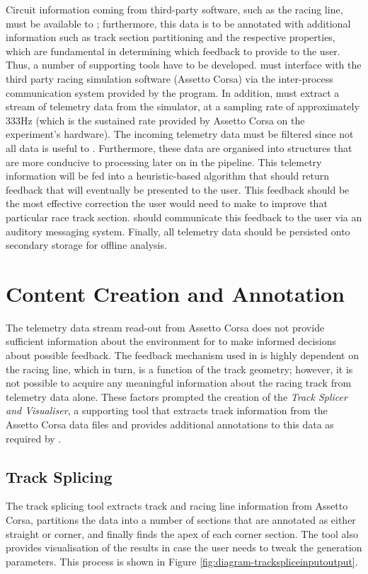 Circuit information coming from third-party software, such as the racing line, must be available to \methodname; furthermore, this data is to be annotated with additional information such as track section partitioning and the respective properties, which are fundamental in determining which feedback to provide to the user. Thus, a number of supporting tools have to be developed.
\methodname must interface with the third party racing simulation software (Assetto Corsa) via the inter-process communication system provided by the program. In addition, \methodname must extract a stream of telemetry data from the simulator, at a sampling rate of approximately 333Hz (which is the sustained rate provided by Assetto Corsa on the experiment's hardware).
The incoming telemetry data must be filtered since not all data is useful to \methodname. Furthermore, these data are organised into structures that are more conducive to processing later on in the pipeline. 
This telemetry information will be fed into a heuristic-based algorithm that should return feedback that will eventually be presented to the user. This feedback should be the most effective correction the user would need to make to improve that particular race track section.
\methodname should communicate this feedback to the user via an auditory messaging system. 
Finally, all telemetry data should be persisted onto secondary storage for offline analysis. 

\section{Content Creation and Annotation}
\label{sec:imp-content-creation}
The telemetry data stream read-out from Assetto Corsa does not provide sufficient information about the environment for \methodname to make informed decisions about possible feedback. The feedback mechanism used in \methodname is highly dependent on the racing line, which in turn, is a function of the track geometry; however, it is not possible to acquire any meaningful information about the racing track from telemetry data alone. These factors prompted the creation of the \emph{Track Splicer and Visualiser}, a supporting tool that extracts track information from the Assetto Corsa data files and provides additional annotations to this data as required by \methodname. 

\subsection{Track Splicing}
\label{sec:imp-trackSplicer}
The track splicing tool extracts track and racing line information from Assetto Corsa, partitions the data into a number of sections that are annotated as either straight or corner, and finally finds the apex of each corner section. The tool also provides visualisation of the results in case the user needs to tweak the generation parameters. This process is shown in Figure \ref{fig:diagram-trackspliceinputoutput}.

